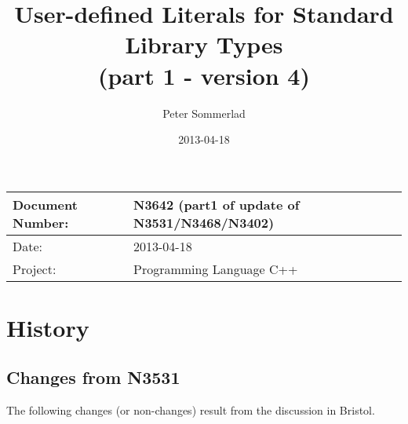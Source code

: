 \documentclass[ebook,11pt,article]{memoir}
\title{User-defined Literals for Standard Library Types\\(part 1 - version 4)}
\author{Peter Sommerlad}
\date{2013-04-18}                                           %
\begin{document}
\maketitle 
\begin{tabular}[t]{|l|l|}\hline 
Document Number: &  N3642 (part1 of update of N3531/N3468/N3402)\\\hline
Date: & 2013-04-18 \\\hline
Project: & Programming Language C++\\\hline 
\end{tabular}
\chapter{History}
\section{Changes from N3531}
The following changes (or non-changes) result from the discussion in Bristol.
\end{document}
